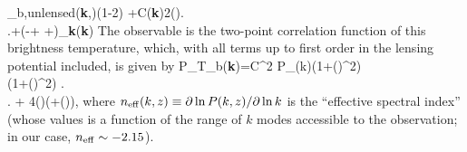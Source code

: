 \delta{}_{\rm b,unlensed}({\bf{k}},)(1-2\kappa) +C\left\lbrace \tilde{\delta}({\bf{k}})2(\cdot{})\right.\\
\left.+\left(-+\bm{\sigma}
+\bm{\Omega}\right)\cdot\bm{\nabla}_{\bf{k}}\tilde{\delta}({\bf{k}})\right\rbrace
\ega
\eeq
The observable is the two-point correlation function of this brightness temperature, which, with all terms up to first order in the lensing potential included, is given by
\beq
\bga
P_{T_{\rm b}}({\bf{k}})=C^2 P_{\delta}(k)\left(1+(\cdot{})^2\right) \times\\
\left\lbrace \left(1+(\cdot{})^2\right) \right.\\
\left. + 4(\cdot{})\left(\cdot\bm{\sigma}\cdot{}+(\bm{\Omega}\times{})\cdot{}\right)\right\rbrace,
\label{eq:Tb_power}
\ega
\eeq
where $n_{\rm eff}(k,z)\equiv \partial\ln P(k,z)/\partial\ln k$ is the ``effective spectral index'' (whose values is a function of the range of $k$ modes accessible to the observation; in our case, $n_{\rm eff}\sim -2.15$).

